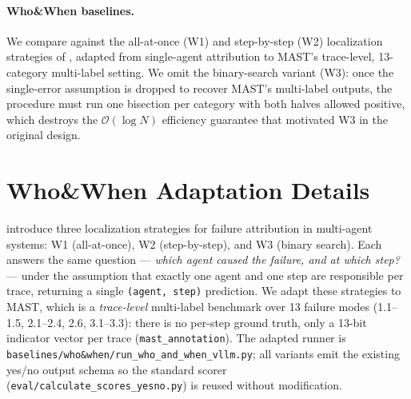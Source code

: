 %
%
%



\paragraph{Who\&When baselines.}
We compare against the all-at-once (\textsc{W1}) and step-by-step
(\textsc{W2}) localization strategies of
\citet{yin2025whoandwhen}, adapted from single-agent attribution to
MAST's trace-level, 13-category multi-label setting. We omit the
binary-search variant (\textsc{W3}): once the single-error
assumption is dropped to recover MAST's multi-label outputs, the
procedure must run one bisection per category with both halves
allowed positive, which destroys the $\mathcal{O}(\log N)$
efficiency guarantee that motivated \textsc{W3} in the original
design.



\section{Who\&When Adaptation Details}
\label{app:whoandwhen_mast}

\citet{yin2025whoandwhen} introduce three localization strategies
for failure attribution in multi-agent systems: \textsc{W1}
(all-at-once), \textsc{W2} (step-by-step), and \textsc{W3} (binary
search). Each answers the same question --- \emph{which agent caused
the failure, and at which step?} --- under the assumption that
exactly one agent and one step are responsible per trace, returning
a single \texttt{(agent, step)} prediction. We adapt these
strategies to MAST, which is a \emph{trace-level} multi-label
benchmark over 13 failure modes
(1.1--1.5, 2.1--2.4, 2.6, 3.1--3.3): there is no per-step ground
truth, only a 13-bit indicator vector per trace
(\texttt{mast\_annotation}). The adapted runner is
\texttt{baselines/who\&when/run\_who\_and\_when\_vllm.py}; all
variants emit the existing yes/no output schema so the standard
scorer (\texttt{eval/calculate\_scores\_yesno.py}) is reused
without modification.

